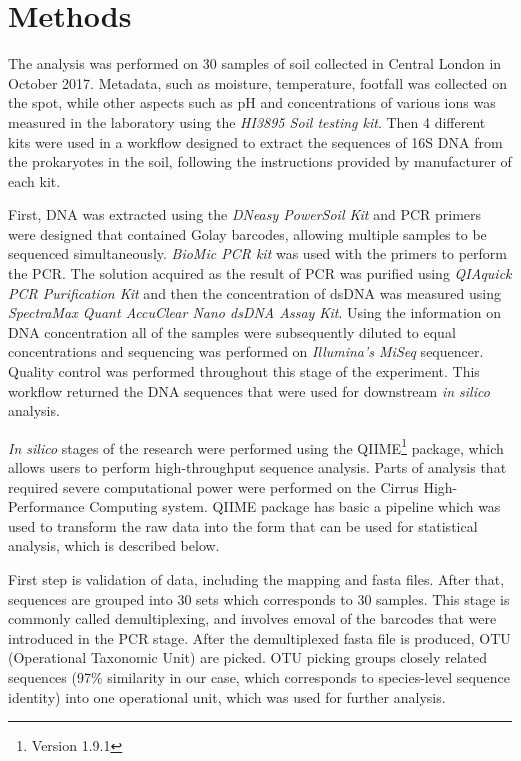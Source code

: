 \documentclass[12pt,twocolumn]{article} %
\begin{document}
\section{Methods}
The analysis was performed on 30 samples of soil collected in Central London in October 2017.  Metadata, such as moisture, temperature, footfall was collected on the spot, while other aspects such as pH and concentrations of various ions was measured in the laboratory using the \textit{HI3895 Soil testing kit}. Then 4 different kits were used in a workflow designed to extract the sequences of 16S DNA from the prokaryotes in the soil, following the instructions provided by manufacturer of each kit.
\par
First, DNA was extracted using the \textit{DNeasy PowerSoil Kit} and PCR primers were designed that contained Golay barcodes, allowing multiple samples to be sequenced simultaneously. \textit{BioMic PCR kit} was used with the primers to perform the PCR. The solution acquired as the result of PCR was purified using \textit{QIAquick PCR Purification Kit} and then the concentration of dsDNA was measured using \textit{SpectraMax Quant AccuClear Nano dsDNA Assay Kit}. Using the information on DNA concentration all of the samples were subsequently diluted to equal concentrations and sequencing was performed on \textit{Illumina's MiSeq} sequencer. Quality control was performed throughout this stage of the experiment. This workflow returned the DNA sequences that were used for downstream \textit{in silico} analysis.
\par
\textit{In silico} stages of the research were performed using the QIIME\footnote{Version 1.9.1} package\cite{Caporaso2010,Kuczynski2012}, which allows users to perform high-throughput sequence analysis. Parts of analysis that required severe computational power were performed on the Cirrus High-Performance Computing system. QIIME package has basic a pipeline which was used to transform the raw data into the form that can be used for statistical analysis, which is described below.
\par
First step is validation of data, including the mapping and fasta files. After that, sequences are grouped into 30 sets which corresponds to 30 samples. This stage is commonly called demultiplexing, and involves emoval of the barcodes that were introduced in the PCR stage. After the demultiplexed fasta file is produced, OTU (Operational Taxonomic Unit) are picked. OTU picking groups closely related sequences (97\% similarity in our case, which corresponds to species-level sequence identity) into one operational unit, which was used for further analysis.
\end{document}
